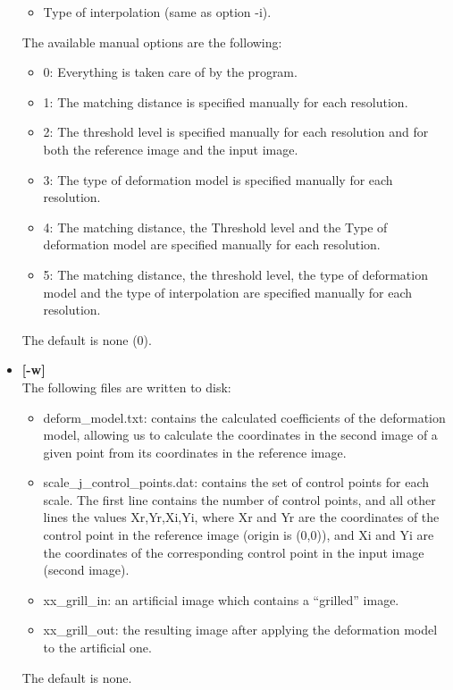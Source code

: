\begin{itemize}
\begin{itemize}
\item Type of interpolation (same as option -i).
\end{itemize}
The available manual options are the following:
\begin{itemize}
\baselineskip=0.4truecm
\itemsep=0.1truecm
\item 0:  Everything is taken care of by the program.
\item 1:  The matching distance is specified manually for each resolution.
\item 2:  The threshold level is specified manually for each resolution  and for
      both the reference image and the input image.
\item 3:  The type of deformation model is specified manually for each resolution.
\item 4:  The matching distance, the Threshold level and the Type of deformation model 
      are specified manually for each resolution.
\item 5:  The matching distance, the threshold level, the type of deformation model 
      and the type of interpolation are specified manually for each resolution.
\end{itemize}
The default is none (0).
\item{\bf [-w]} \\
The following files are written to  disk:
\begin{itemize}
\baselineskip=0.4truecm
\item deform\_model.txt: contains the calculated coefficients of the 
deformation model, allowing us to calculate the coordinates in the 
second image of a given point from its coordinates in the reference image.
\item scale\_j\_control\_points.dat: contains the set of control points for
 each scale. The first line contains the number of control points, and all
 other lines the values Xr,Yr,Xi,Yi,
 where  Xr and Yr are the coordinates of the control point in the reference 
 image (origin is (0,0)), and  Xi and Yi are the coordinates of the 
 corresponding control point in the input image (second image).
 \item xx\_grill\_in: an artificial image which contains a ``grilled'' image.
 \item xx\_grill\_out: the resulting image after applying the deformation 
 model to the artificial one.
\end{itemize}
The default is none.
\end{itemize}

